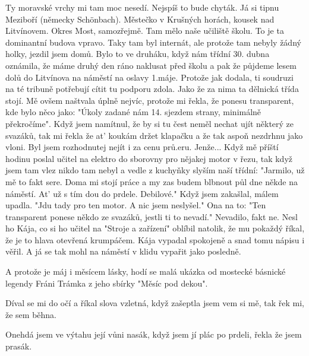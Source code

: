 

Ty moravské vrchy mi tam moc nesedí. Nejspíš to bude chyták. Já si
tipnu Meziboří (německy Schönbach). Městečko v Krušných horách, kousek
nad Litvínovem. Okres Most, samozřejmě. Tam mělo naše učiliště školu.
To je ta dominantní budova vpravo. Taky tam byl internát, ale protože
tam nebyly žádný holky, jezdil jsem domů. Bylo to ve druháku, když nám
třídní 30. dubna oznámila, že máme druhý den ráno naklusat před školu
a pak že půjdeme lesem dolů do Litvínova na náměstí na oslavy 1.máje.
Protože jak dodala, ti soudruzi na té tribuně potřebují cítit tu
podporu zdola. Jako že za nima ta dělnická třída stojí. Mě ovšem
naštvala úplně nejvíc, protože mi řekla, že ponesu transparent, kde
bylo něco jako: "Úkoly zadané nám 14. sjezdem strany, minimálně
překročíme". Když jsem namítnul, že by si tu čest neměl nechat ujít
některý ze svazáků, tak mi řekla že at' koukám držet klapačku a že tak
aspoň nezdrhnu jako vloni. Byl jsem rozhodnutej nejít i za cenu
prů.eru. Jenže... Když mě příští hodinu poslal učitel na elektro do
sborovny pro nějakej motor v řezu, tak když jsem tam vlez nikdo tam
nebyl a vedle z kuchyňky slyším naší třídní: "Jarmilo, už mě to fakt
sere. Doma mi stojí práce a my zas budem blbnout půl dne někde na
náměstí. At' už s tím dou do prdele. Debilové." Když jsem zakašlal,
málem upadla. "Jdu tady pro ten motor. A nic jsem neslyšel." Ona na
to: "Ten transparent ponese někdo ze svazáků, jestli ti to nevadí."
Nevadilo, fakt ne. Nesl ho Kája, co si ho učitel na "Stroje a
zařízení" oblíbil natolik, že mu pokaždý říkal, že je to hlava
otevřená krumpáčem. Kája vypadal spokojeně a snad tomu nápisu i věřil.
A já se tak mohl na náměstí v klidu vypařit jako posledně.

A protože je máj i měsícem lásky, hodí se malá ukázka od mostecké
básnické legendy Fráni Trámka z jeho sbírky "Měsíc pod dekou".

Díval se mi do očí
a říkal slova vzletná,
když zašeptla jsem vem si mě,
tak řek mi, že sem běhna.

Onehdá jsem ve výtahu její vůni nasák,
když jsem jí plác po prdeli,
řekla že jsem prasák.
